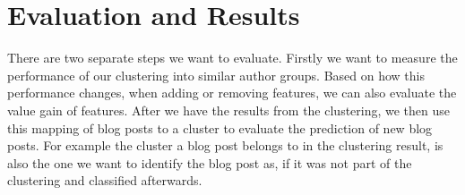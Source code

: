 \section{Evaluation and Results}
\label{sec:results}


There are two separate steps we want to evaluate.
Firstly we want to measure the performance of our clustering into similar author groups.
Based on how this performance changes, when adding or removing features, we can also evaluate the value gain of features.
After we have the results from the clustering, we then use this mapping of blog posts to a cluster to evaluate the prediction of new blog posts.
For example the cluster a blog post belongs to in the clustering result, is also the one we want to identify the blog post as, if it was not part of the clustering and classified afterwards.


